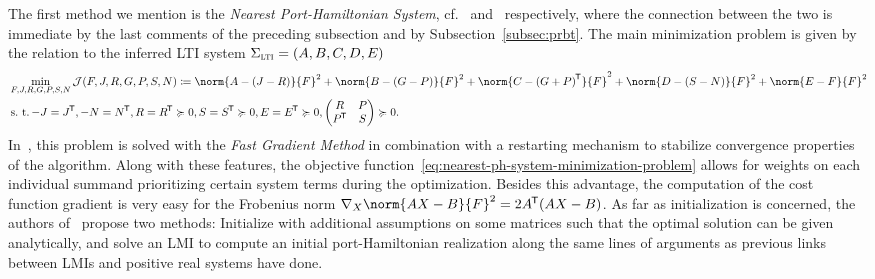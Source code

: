 The first method we mention is the \emph{Nearest Port-Hamiltonian System}, cf.~\cite{Gillis2018} and~\cite{Cherifi2019} respectively, where the connection between the two is immediate by the last comments of the preceding subsection and by Subsection~\ref{subsec:prbt}.
The main minimization problem is given by the relation to the inferred LTI system $\Sigma_{\textnormal{\scshape lti}} = (A, B, C, D, E)$
\begin{equation}\label{eq:nearest-ph-system-minimization-problem}
    \begin{aligned}
        &\min\limits_{F, J, R, G, P, S, N} \mcl{J}(F, J, R, G, P, S, N) \coloneqq \norm{A - (J - R)}{F}^2 + \norm{B - (G - P)}{F}^2 + \norm{C - {(G + P)}\trans}{F}^2 + \norm{D - (S - N)}{F}^2 + \norm{E - F}{F}^2 \\
        &\suchthat -J = J\trans, -N = N\trans, R = R\trans \succcurlyeq 0, S = S\trans \succcurlyeq 0, E = E\trans \succcurlyeq 0, \begin{pmatrix}
            R & P \\
            P\trans & S
        \end{pmatrix} \succcurlyeq 0.
    \end{aligned}
\end{equation}
In~\cite{Gillis2018}, this problem is solved with the \emph{Fast Gradient Method} in combination with a restarting mechanism to stabilize convergence properties of the algorithm.
Along with these features, the objective function~\eqref{eq:nearest-ph-system-minimization-problem} allows for weights on each individual summand prioritizing certain system terms during the optimization.
Besides this advantage, the computation of the cost function gradient is very easy for the Frobenius norm $\nabla_X \norm{A X - B}{F}^2 = 2 A\trans (A X - B)$.
As far as initialization is concerned, the authors of~\cite{Gillis2018} propose two methods: Initialize with additional assumptions on some matrices such that the optimal solution can be given analytically, and solve an LMI to compute an initial port-Hamiltonian realization along the same lines of arguments as previous links between LMIs and positive real systems have done.


